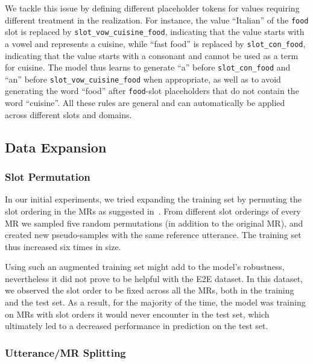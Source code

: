 \documentclass[11pt,a4paper]{article}
\begin{document}
We tackle this issue by defining different placeholder tokens for values requiring different treatment in the realization. For instance, the value ``Italian'' of the \texttt{food} slot is replaced by \texttt{slot\_vow\_cuisine\_food}, indicating that the value starts with a vowel and represents a cuisine, while ``fast food'' is replaced by \texttt{slot\_con\_food}, indicating that the value starts with a consonant and cannot be used as a term for cuisine. The model thus learns to generate ``a'' before \texttt{slot\_con\_food} and ``an'' before \texttt{slot\_vow\_cuisine\_food} when appropriate, as well as to avoid generating the word ``food'' after \texttt{food}-slot placeholders that do not contain the word ``cuisine''. All these rules are general and can automatically be applied across different slots and domains.


\subsection{Data Expansion}

\subsubsection*{Slot Permutation}

In our initial experiments, we tried expanding the training set by permuting the slot ordering in the MRs as suggested in~\citet{nayak2017plan}. From different slot orderings of every MR we sampled five random permutations (in addition to the original MR), and created new pseudo-samples with the same reference utterance. The training set thus increased six times in size.

Using such an augmented training set might add to the model's robustness, nevertheless it did not prove to be helpful with the E2E dataset. In this dataset, we observed the slot order to be fixed across all the MRs, both in the training and the test set. As a result, for the majority of the time, the model was training on MRs with slot orders it would never encounter in the test set, which ultimately led to a decreased performance in prediction on the test set.

\subsubsection*{Utterance/MR Splitting}
\end{document}
